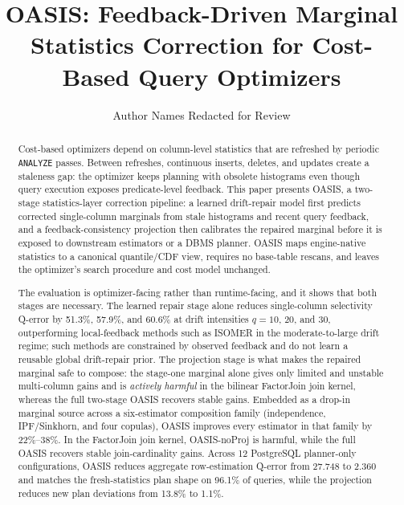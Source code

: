 \documentclass[preprint,12pt]{elsarticle}
\begin{document}
\begin{frontmatter}

\title{OASIS: Feedback-Driven Marginal Statistics Correction for Cost-Based Query Optimizers}

\author[inst1]{Author Names Redacted for Review}

\begin{abstract}
Cost-based optimizers depend on column-level statistics that are refreshed by
periodic \texttt{ANALYZE} passes. Between refreshes, continuous inserts,
deletes, and updates create a staleness gap: the optimizer keeps planning with
obsolete histograms even though query execution exposes predicate-level
feedback. This paper presents OASIS, a two-stage statistics-layer correction
pipeline: a learned drift-repair model first predicts corrected single-column
marginals from stale histograms and recent query feedback, and a
feedback-consistency projection then calibrates the repaired marginal before it
is exposed to downstream estimators or a DBMS planner. OASIS maps engine-native
statistics to a canonical quantile/CDF view, requires no base-table rescans, and
leaves the optimizer's search procedure and cost model unchanged.

The evaluation is optimizer-facing rather than runtime-facing, and it shows that
both stages are necessary. The learned repair stage alone reduces single-column
selectivity Q-error by 51.3\%, 57.9\%, and 60.6\% at drift intensities $q=10$,
$20$, and $30$, outperforming local-feedback methods such as ISOMER in the
moderate-to-large drift regime; such methods are constrained by observed
feedback and do not learn a reusable global drift-repair prior. The projection
stage is what makes the repaired marginal safe to compose: the stage-one
marginal alone gives only limited and unstable multi-column gains and is
\emph{actively harmful} in the bilinear FactorJoin join kernel, whereas the full
two-stage OASIS recovers stable gains. Embedded as a drop-in marginal source
across a six-estimator composition family (independence, IPF/Sinkhorn, and four
copulas), OASIS improves every estimator in that family by 22\%--38\%. In the
FactorJoin join kernel, OASIS-noProj is harmful, while the full OASIS recovers
stable join-cardinality gains. Across 12 PostgreSQL planner-only configurations,
OASIS reduces aggregate row-estimation Q-error from 27.748 to 2.360 and matches
the fresh-statistics plan shape on 96.1\% of queries, while the projection
reduces new plan deviations from 13.8\% to 1.1\%.


\end{abstract}
\end{frontmatter}
\end{document}
